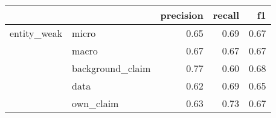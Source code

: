\begin{tabular}{llrrr}
\toprule
            &           &  precision &  recall &   f1 \\
\midrule
entity\_weak & micro &       0.65 &    0.69 & 0.67 \\
            & macro &       0.67 &    0.67 & 0.67 \\
            & background\_claim &       0.77 &    0.60 & 0.68 \\
            & data &       0.62 &    0.69 & 0.65 \\
            & own\_claim &       0.63 &    0.73 & 0.67 \\
\bottomrule
\end{tabular}
